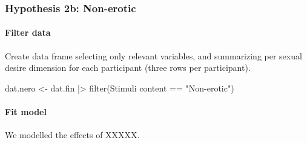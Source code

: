 \documentclass[
  bookmarksnumbered]{article}
\newenvironment{Shaded}{\begin{snugshade}}{\end{snugshade}}
\newcommand{\AttributeTok}[1]{\textcolor[rgb]{0.80,0.80,0.80}{#1}}
\newcommand{\FunctionTok}[1]{\textcolor[rgb]{0.94,0.94,0.56}{#1}}
\newcommand{\NormalTok}[1]{\textcolor[rgb]{0.80,0.80,0.80}{#1}}
\newcommand{\OtherTok}[1]{\textcolor[rgb]{0.94,0.94,0.56}{#1}}
\newcommand{\SpecialCharTok}[1]{\textcolor[rgb]{0.86,0.64,0.64}{#1}}
\newcommand{\StringTok}[1]{\textcolor[rgb]{0.80,0.58,0.58}{#1}}
\begin{document}
\hypertarget{hypothesis2b}{%
\subsubsection{Hypothesis 2b: Non-erotic}\label{hypothesis2b}}

\hypertarget{filter-data-2}{%
\paragraph{Filter data}\label{filter-data-2}}

Create data frame selecting only relevant variables, and summarizing per sexual desire dimension for each participant (three rows per participant).

\begin{Shaded}
\begin{Highlighting}[]
\NormalTok{dat.nero }\OtherTok{\textless{}{-}}\NormalTok{ dat.fin }\SpecialCharTok{|\textgreater{}}
  \FunctionTok{filter}\NormalTok{(}\StringTok{\textasciigrave{}}\AttributeTok{Stimuli content}\StringTok{\textasciigrave{}} \SpecialCharTok{==} \StringTok{"Non{-}erotic"}\NormalTok{)}
\end{Highlighting}
\end{Shaded}

\hypertarget{fit-model-2}{%
\paragraph{Fit model}\label{fit-model-2}}

We modelled the effects of XXXXX.
\end{document}
